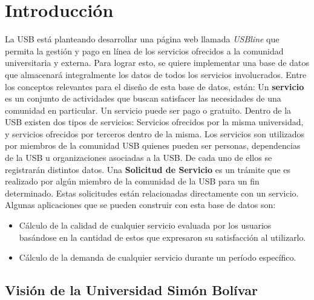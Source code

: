 \documentclass[12pt,a4paper,spanish]{article}
\begin{document}
\section{Introducci\'on}
\indent La USB est\'a planteando desarrollar una p\'agina web llamada \emph{USBline} que permita
la gesti\'on y pago en l\'inea de los servicios ofrecidos a la comunidad universitaria y externa. Para lograr
esto, se quiere implementar una base de datos que almacenar\'a integralmente los datos de todos los servicios
involucrados.
\newline
\newline
\indent Entre los conceptos relevantes para el dise\~no de esta base de datos, est\'an:
\newline
\newline
\indent Un \textbf{servicio} es un conjunto de actividades que buscan
satisfacer las necesidades de una comunidad en particular. Un servicio
puede ser pago o gratuito. Dentro de la USB existen dos tipos de
servicios: Servicios ofrecidos por la misma universidad, y servicios
ofrecidos por terceros dentro de la misma.
\newline
\newline
\indent Los servicios son utilizados por miembros de la comunidad USB quienes pueden ser
personas, dependencias de la USB u organizaciones asociadas a la USB. De cada uno de ellos
se registrar\'an distintos datos.
\newline
\newline
\indent Una \textbf{Solicitud de Servicio} es un tr\'amite que es realizado por alg\'un miembro de la comunidad de la USB 
para un fin determinado. Estas solicitudes est\'an relacionadas directamente con un servicio.
\newline
\newline
\indent Algunas aplicaciones que se pueden construir con esta base de datos son:
 \begin{itemize}
 \item C\'alculo de la calidad de cualquier servicio evaluada por los usuarios bas\'andose
en la cantidad de estos que expresaron su satisfacci\'on al utilizarlo.
 \item C\'alculo de la demanda de cualquier servicio durante un per\'iodo espec\'ifico.
\end{itemize}

\subsection{Visi\'on de la Universidad Sim\'on Bol\'ivar}
\end{document}
